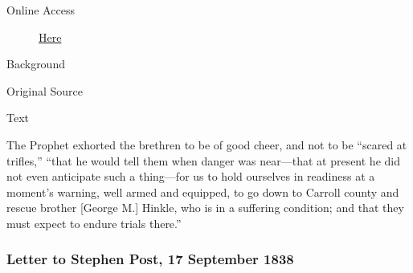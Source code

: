 				\begin{description}
					\item[Online Access] \href{https://www.josephsmithpapers.org/paper-summary/discourse-12-august-1838/1}{Here}
				\end{description}
				
				\begin{description}
					\item[Background]
				\end{description}
				
				
				\begin{description}
					\item[Original Source]
				\end{description}
				
				
				\begin{description}
					\item[Text]
				\end{description}
				
					The Prophet exhorted the brethren to be of good cheer, and not to be ``scared at trifles,'' ``that he would tell them when danger was near---that at present he did not even anticipate such a thing---for us to hold ourselves in readiness at a moment's warning, well armed and equipped, to go down to Carroll county and rescue brother [George M.] Hinkle, who is in a suffering condition; and that they must expect to endure trials there.''
					
		\subsubsection{Letter to Stephen Post, 17 September 1838}
			\label{EMS-1838-JS-17-SEP-1838}
			
